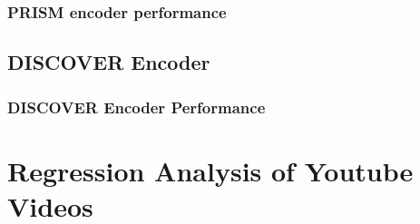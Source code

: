 \documentclass[letterpaper,12pt,titlepage,oneside,final]{report}
\begin{document}
        \subsection{PRISM encoder performance}

    \section{DISCOVER Encoder}
        \subsection{DISCOVER Encoder Performance}

\chapter{Regression Analysis of Youtube Videos}
\end{document}
